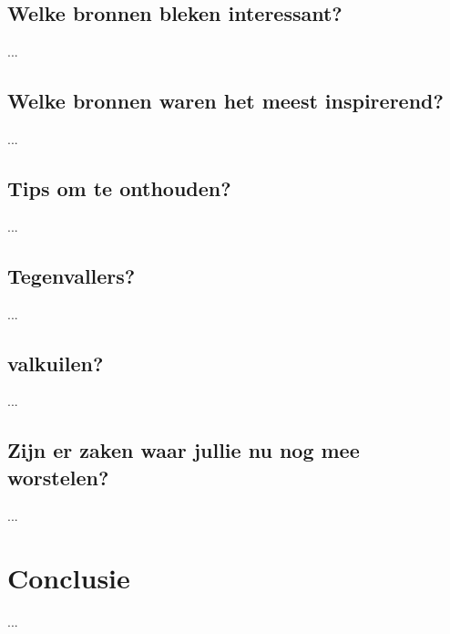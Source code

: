 \documentclass[fleqn,10pt]{voorstel}
\begin{document}
\subsection{Welke bronnen bleken interessant?}
...
\subsection{Welke bronnen waren het meest inspirerend?}
...
\subsection{Tips om te onthouden?}
...
\subsection{Tegenvallers?}
...
\subsection{valkuilen?}
...
\subsection{Zijn er zaken waar jullie nu nog mee worstelen?}
...

\section{Conclusie}
...




\end{document}
